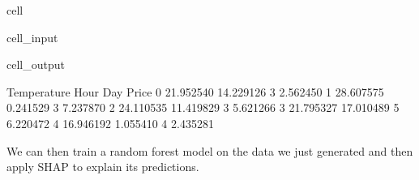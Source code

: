 \documentclass[letterpaper,10pt,english]{jupyterBook}
\begin{document}
\begin{sphinxuseclass}{cell}
\begin{sphinxVerbatimInput}
\begin{sphinxuseclass}{cell_input}
\begin{sphinxVerbatim}[commandchars=\\\{\}]
\end{sphinxVerbatim}

\end{sphinxuseclass}\end{sphinxVerbatimInput}
\begin{sphinxVerbatimOutput}

\begin{sphinxuseclass}{cell_output}
\begin{sphinxVerbatim}[commandchars=\\\{\}]
   Temperature       Hour  Day     Price
0    21.952540  14.229126    3 \PYGZhy{}2.562450
1    28.607575   0.241529    3  7.237870
2    24.110535  11.419829    3  5.621266
3    21.795327  17.010489    5  6.220472
4    16.946192   1.055410    4 \PYGZhy{}2.435281
\end{sphinxVerbatim}

\end{sphinxuseclass}\end{sphinxVerbatimOutput}

\end{sphinxuseclass}
\sphinxAtStartPar
We can then train a random forest model on the data we just generated and then apply SHAP to explain its predictions.
\end{document}
